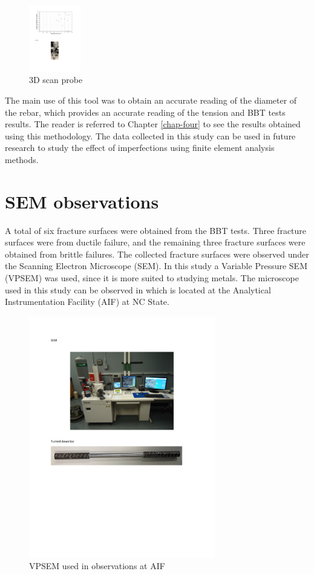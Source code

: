 \begin{figure}[htbp]
    \centering
    \includegraphics[width=0.2\textwidth]{VAC Thesis 2.0/Chapter-3/figs/3d_scanner_01.pdf}
    \caption{3D scan probe}
    \label{fig:3d_scanner_probe}
\end{figure}
The main use of this tool was to obtain an accurate reading of the diameter of the rebar, which provides an accurate reading of the tension and BBT tests results. The reader is referred to Chapter \ref{chap-four} to see the results obtained using this methodology. The data collected in this study can be used in future research to study the effect of imperfections using finite element analysis methods.

\section{SEM observations}

A total of six fracture surfaces were obtained from the BBT tests. Three fracture surfaces were from ductile failure, and the remaining three fracture surfaces were obtained from brittle failures. The collected fracture surfaces were observed under the Scanning Electron Microscope (SEM). In this study a Variable Pressure SEM (VPSEM) was used, since it is more suited to  studying metals. The microscope used in this study can be observed in  which is located at the Analytical Instrumentation Facility (AIF) at NC State.

\begin{figure}[htbp]
    \centering
    \includegraphics[width=0.725\textwidth]{VAC Thesis 2.0/Chapter-3/figs/SEM_photo.pdf}
    \caption{VPSEM used in observations at AIF}
    \label{fig:sem_photo}
\end{figure}

